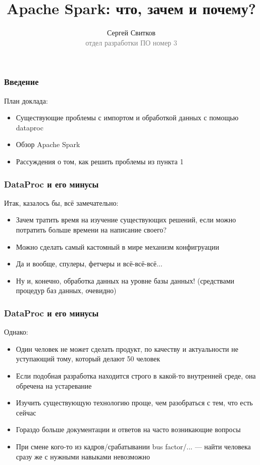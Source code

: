 \documentclass{beamer}
\begin{document}
\title{Apache Spark: что, зачем и почему?}
\author{Сергей Свитков\\{\footnotesize\textcolor{gray}{отдел разработки ПО номер 3}}}
\frame{\titlepage}

\begin{frame}\frametitle{Введение}
План доклада:
\begin{itemize}
    \item Существующие проблемы с импортом и обработкой данных с помощью dataproc
    \item Обзор Apache Spark
    \item Рассуждения о том, как решить проблемы из пункта 1
\end{itemize}
\end{frame}

\begin{frame}\frametitle{DataProc и его минусы}
Итак, казалось бы, всё замечательно:
\begin{itemize}
    \item Зачем тратить время на изучение существующих решений, если можно потратить больше времени на написание своего?
    \item Можно сделать самый кастомный в мире механизм конфигруации
    \item Да и вообще, спулеры, фетчеры и всё-всё-всё...
    \item Ну и, конечно, обработка данных на уровне базы данных! (средствами процедур баз данных, очевидно)
\end{itemize}
\end{frame}

\begin{frame}\frametitle{DataProc и его минусы}
Однако:
\begin{itemize}
    \item Один человек не может сделать продукт, по качеству и актуальности не уступающий тому, который делают 50 человек
    \item Если подобная разработка находится строго в какой-то внутренней среде, она обречена на устаревание
    \item Изучить существующую технологию проще, чем разобраться с тем, что есть сейчас
    \item Гораздо больше документации и ответов на часто возникающие вопросы
    \item При смене кого-то из кадров/срабатывании bus factor/... --- найти человека сразу же с нужными навыками невозможно
\end{itemize}
\end{frame}
\end{document}
